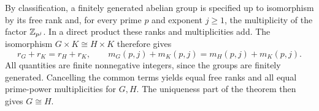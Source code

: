 By classification, a finitely generated abelian group is specified up to isomorphism by its free rank and, for every prime $p$ and exponent $j\ge1$, the multiplicity of the factor $\mathbb{Z}_{p^j}$. In a direct product these ranks and multiplicities add. The isomorphism $G\times K\cong H\times K$ therefore gives
\[r_G+r_K=r_H+r_K,\qquad m_G(p,j)+m_K(p,j)=m_H(p,j)+m_K(p,j).
\]
All quantities are finite nonnegative integers, since the groups are finitely generated. Cancelling the common terms yields equal free ranks and all equal prime-power multiplicities for $G,H$. The uniqueness part of the theorem then gives $G\cong H$.
